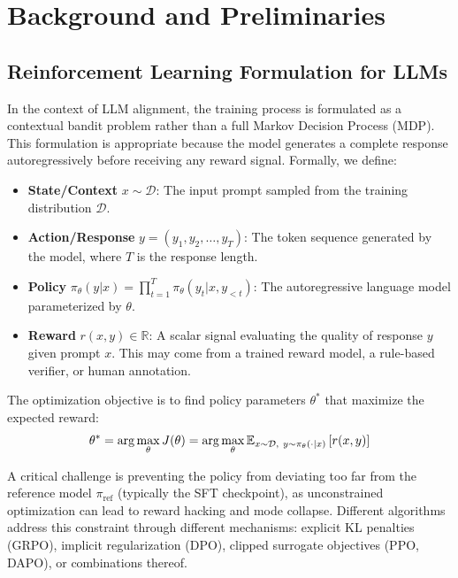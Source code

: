 \section{Background and Preliminaries}
\label{sec:bg}

\subsection{Reinforcement Learning Formulation for LLMs}

In the context of LLM alignment, the training process is formulated as a contextual bandit problem rather than a full Markov Decision Process (MDP). This formulation is appropriate because the model generates a complete response autoregressively before receiving any reward signal. Formally, we define:

\begin{itemize}[leftmargin=*, itemsep=1pt]
\item \textbf{State/Context} $x \sim \mathcal{D}$: The input prompt sampled from the training distribution $\mathcal{D}$.
\item \textbf{Action/Response} $y = (y_1, y_2, \ldots, y_T)$: The token sequence generated by the model, where $T$ is the response length.
\item \textbf{Policy} $\pi_\theta(y|x) = \prod_{t=1}^{T} \pi_\theta(y_t | x, y_{<t})$: The autoregressive language model parameterized by $\theta$.
\item \textbf{Reward} $r(x, y) \in \mathbb{R}$: A scalar signal evaluating the quality of response $y$ given prompt $x$. This may come from a trained reward model, a rule-based verifier, or human annotation.
\end{itemize}

The optimization objective is to find policy parameters $\theta^*$ that maximize the expected reward:
\begin{equation}
\theta^* = \arg\max_\theta J(\theta) = \arg\max_\theta \mathbb{E}_{x \sim \mathcal{D},\ y \sim \pi_\theta(\cdot|x)}\left[r(x, y)\right]
\label{eq:obj}
\end{equation}

A critical challenge is preventing the policy from deviating too far from the reference model $\pi_{\text{ref}}$ (typically the SFT checkpoint), as unconstrained optimization can lead to reward hacking and mode collapse. Different algorithms address this constraint through different mechanisms: explicit KL penalties (GRPO), implicit regularization (DPO), clipped surrogate objectives (PPO, DAPO), or combinations thereof.

